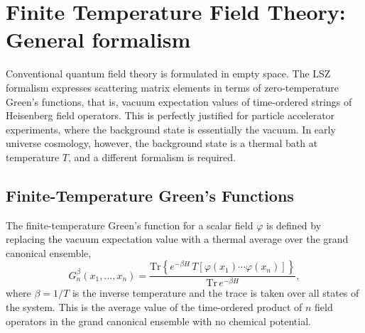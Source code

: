 \chapter{Finite Temperature Field Theory: General formalism}
\label{ch:finite-temperature}

Conventional quantum field theory is formulated in empty space. The LSZ
formalism expresses scattering matrix elements in terms of zero-temperature
Green's functions, that is, vacuum expectation values of time-ordered
strings of Heisenberg field operators. This is perfectly justified for
particle accelerator experiments, where the background state is
essentially the vacuum. In early universe cosmology, however, the
background state is a thermal bath at temperature $T$, and a different
formalism is required.

\section{Finite-Temperature Green's Functions}

The finite-temperature Green's function for a scalar field $\varphi$ is
defined by replacing the vacuum expectation value with a thermal average
over the grand canonical ensemble,
\begin{equation}
	G_n^\beta(x_1,\ldots,x_n)
	= \frac{\mathrm{Tr}\left\{e^{-\beta H}\,
		T\left[\varphi(x_1)\cdots\varphi(x_n)\right]\right\}}
	{\mathrm{Tr}\,e^{-\beta H}},
\end{equation}
where $\beta = 1/T$ is the inverse temperature and the trace is taken
over all states of the system. This is the average value of the
time-ordered product of $n$ field operators in the grand canonical
ensemble with no chemical potential.

